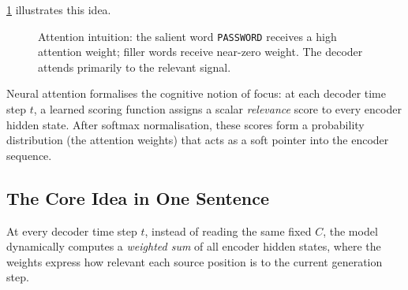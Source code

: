 \documentclass[12pt,a4paper]{article}
\begin{document}
\cref{fig:attention-intuition} illustrates this idea.

\begin{figure}[ht]
\centering
{}
\caption{Attention intuition: the salient word \texttt{PASSWORD}
         receives a high attention weight; filler words receive
         near-zero weight.  The decoder attends primarily to the
         relevant signal.}
\label{fig:attention-intuition}
\end{figure}

\begin{keyinsight}[title=Attention as Selective Focus]
  Neural attention formalises the cognitive notion of focus:
  at each decoder time step $t$, a learned scoring function assigns
  a scalar \emph{relevance} score to every encoder hidden state.
  After softmax normalisation, these scores form a probability
  distribution (the attention weights) that acts as a soft pointer
  into the encoder sequence.
\end{keyinsight}

\subsection{The Core Idea in One Sentence}

At every decoder time step $t$, instead of reading the same fixed
$C$, the model dynamically computes a \emph{weighted sum} of all
encoder hidden states, where the weights express how relevant each
source position is to the current generation step.
\end{document}
